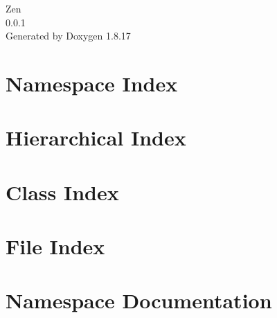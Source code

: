 \let\mypdfximage\pdfximage\def\pdfximage{\immediate\mypdfximage}\documentclass[twoside]{book}
\newcommand{\+}{\discretionary{\mbox{\scriptsize$\hookleftarrow$}}{}{}}
\newcommand{\clearemptydoublepage}{%
  \newpage{\pagestyle{empty}\cleardoublepage}%
}
\begin{document}
\hypersetup{pageanchor=false,
             bookmarksnumbered=true,
             pdfencoding=unicode
            }
\begin{titlepage}
\vspace*{7cm}
\begin{center}%
{\Large Zen \\[1ex]\large 0.\+0.\+1 }\\
\vspace*{1cm}
{\large Generated by Doxygen 1.8.17}\\
\end{center}
\end{titlepage}
\clearemptydoublepage
{}
\tableofcontents
\clearemptydoublepage
{}
\hypersetup{pageanchor=true}

\chapter{Namespace Index}

\chapter{Hierarchical Index}

\chapter{Class Index}

\chapter{File Index}

\chapter{Namespace Documentation}




\end{document}
